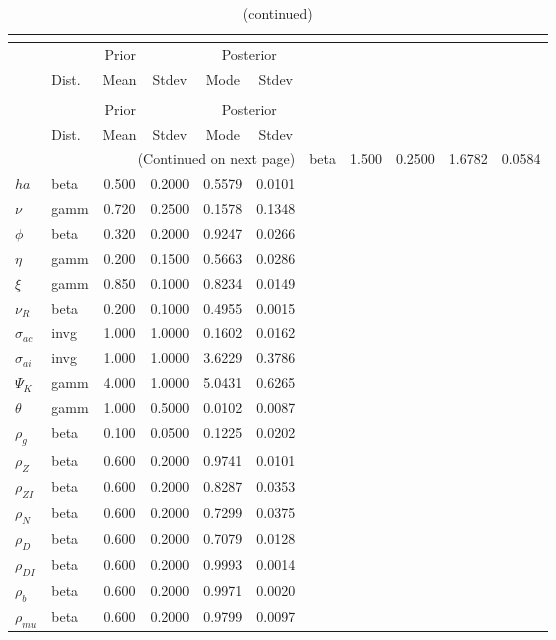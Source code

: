  
\begin{center}
\begin{longtable}{llcccc} 
\caption{Results from posterior maximization (parameters)}\\
 \label{Table:Posterior:1}\\
\toprule 
  & \multicolumn{3}{c}{Prior}  &  \multicolumn{2}{c}{Posterior} \\
  \cmidrule(r{.75em}){2-4} \cmidrule(r{.75em}){5-6}
  & Dist. & Mean  & Stdev & Mode & Stdev \\ 
\midrule \endfirsthead 
\caption{(continued)}\\
 \bottomrule 
  & \multicolumn{3}{c}{Prior}  &  \multicolumn{2}{c}{Posterior} \\
  \cmidrule(r{.75em}){2-4} \cmidrule(r{.75em}){5-6}
  & Dist. & Mean  & Stdev & Mode & Stdev \\ 
\midrule \endhead 
\bottomrule \multicolumn{6}{r}{(Continued on next page)}\endfoot 
\bottomrule\endlastfoot 
${\sigma}$ & beta &   1.500 & 0.2500 &   1.6782 &  0.0584 \\ 
${ha}$ & beta &   0.500 & 0.2000 &   0.5579 &  0.0101 \\ 
$\nu$ & gamm &   0.720 & 0.2500 &   0.1578 &  0.1348 \\ 
${\phi}$ & beta &   0.320 & 0.2000 &   0.9247 &  0.0266 \\ 
${\eta}$ & gamm &   0.200 & 0.1500 &   0.5663 &  0.0286 \\ 
$\xi$ & gamm &   0.850 & 0.1000 &   0.8234 &  0.0149 \\ 
${\nu_R}$ & beta &   0.200 & 0.1000 &   0.4955 &  0.0015 \\ 
${\sigma_{ac}}$ & invg &   1.000 & 1.0000 &   0.1602 &  0.0162 \\ 
${\sigma_{ai}}$ & invg &   1.000 & 1.0000 &   3.6229 &  0.3786 \\ 
${\Psi_{K}}$ & gamm &   4.000 & 1.0000 &   5.0431 &  0.6265 \\ 
${\theta}$ & gamm &   1.000 & 0.5000 &   0.0102 &  0.0087 \\ 
${\rho_g}$ & beta &   0.100 & 0.0500 &   0.1225 &  0.0202 \\ 
${\rho_Z}$ & beta &   0.600 & 0.2000 &   0.9741 &  0.0101 \\ 
${\rho_{ZI}}$ & beta &   0.600 & 0.2000 &   0.8287 &  0.0353 \\ 
${\rho_N}$ & beta &   0.600 & 0.2000 &   0.7299 &  0.0375 \\ 
${\rho_D}$ & beta &   0.600 & 0.2000 &   0.7079 &  0.0128 \\ 
${\rho_{DI}}$ & beta &   0.600 & 0.2000 &   0.9993 &  0.0014 \\ 
${\rho_b}$ & beta &   0.600 & 0.2000 &   0.9971 &  0.0020 \\ 
${\rho_{mu}}$ & beta &   0.600 & 0.2000 &   0.9799 &  0.0097 \\ 
\end{longtable}
 \end{center}
